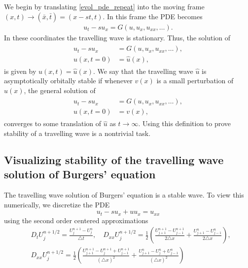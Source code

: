 We begin by translating \eqref{evol_pde_repeat} into the moving frame $(x,t) \to (\bar{x},\bar{t}) = (x-st, t)$.
In this frame the PDE becomes
\begin{align*}
u_t - su_x = G(u,u_x, u_{xx}, \ldots).
\end{align*}
In these coordinates the travelling wave is stationary.
Thus, the solution of 
\begin{align*}
\begin{split}
u_t - su_x &= G(u,u_x, u_{xx}, \ldots), \\
u(x,t = 0) &= \hat{u}(x), 
\end{split}
\end{align*}
is given by $u(x,t) = \hat{u}(x)$.
We say that the travelling wave $\hat{u}$ is asymptotically orbitally stable if whenever $v(x)$ is a small perturbation of $\hat{u}(x)$, the general solution of 
\begin{align*}
\begin{split}
u_t - su_x &= G(u,u_x, u_{xx}, \ldots), \\
u(x,t = 0) &= v(x), 
\end{split}
\end{align*}
converges to some translation of $\hat{u}$ as $t \to \infty$.
Using this definition to prove stability of a travelling wave is a nontrivial task.

\subsection*{Visualizing stability of the travelling wave solution of Burgers' equation}
The travelling wave solution of Burgers' equation is a stable wave.
To view this numerically, we discretize the PDE
\[u_t -su_x + uu_x = u_{xx}\]
using the second order centered approximations
\begin{align*}
&{ } D_t U_j^{n+1/2} = \frac{U_j^{n+1}-U_j^n}{\triangle t}, \quad
D_{xx}U_j^{n+1/2} = \frac{1}{2} \left( \frac{U_{j+1}^{n+1}-U_{j-1}^{n+1}}{2 \triangle x} +  \frac{U_{j+1}^{n}-U_{j-1}^{n}}{2 \triangle x}\right),\\
&{ } D_{xx}U_j^{n+1/2} = \frac{1}{2} \left( \frac{U_{j+1}^{n+1}- U_{j}^{n+1}+U_{j-1}^{n+1}}{(\triangle x)^2} + \frac{U_{j+1}^{n}- U_{j}^{n}+U_{j-1}^{n}}{(\triangle x)^2}\right)
\end{align*}


